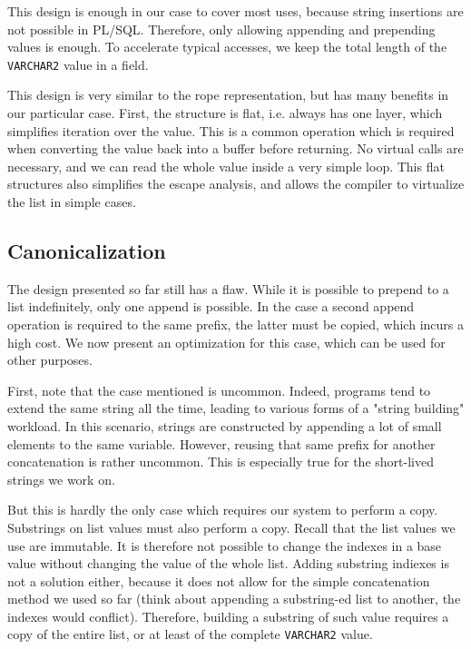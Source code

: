 \documentclass[twoside,11pt,a4paper]{article}
\newcommand{\pls}[1]{\small\texttt{#1}\normalsize}
\newcommand{\plstype}[1]{\pls{#1}}
\newcommand{\varchar}{\plstype{VARCHAR2}}
\begin{document}
This design is enough in our case to cover most uses, because string insertions are not possible in PL/SQL. Therefore, only allowing appending and prepending values is enough. To accelerate typical accesses, we keep the total length of the \varchar{} value in a field.

This design is very similar to the rope representation, but has many benefits in our particular case. First, the structure is flat, i.e. always has one layer, which simplifies iteration over the value. This is a common operation which is required when converting the value back into a buffer before returning. No virtual calls are necessary, and we can read the whole value inside a very simple loop. This flat structures also simplifies the escape analysis, and allows the compiler to virtualize the list in simple cases.

\subsection{Canonicalization}


The design presented so far still has a flaw. While it is possible to prepend to a list indefinitely, only one append is possible. In the case a second append operation is required to the same prefix, the latter must be copied, which incurs a high cost. We now present an optimization for this case, which can be used for other purposes.

First, note that the case mentioned is uncommon. Indeed, programs tend to extend the same string all the time, leading to various forms of a "string building" workload. In this scenario, strings are constructed by appending a lot of small elements to the same variable. However, reusing that same prefix for another concatenation is rather uncommon. This is especially true for the short-lived strings we work on.

But this is hardly the only case which requires our system to perform a copy. Substrings on list values must also perform a copy. Recall that the list values we use are immutable. It is therefore not possible to change the indexes in a base value without changing the value of the whole list. Adding substring indiexes is not a solution either, because it does not allow for the simple concatenation method we used so far (think about appending a substring-ed list to another, the indexes would conflict). Therefore, building a substring of such value requires a copy of the entire list, or at least of the complete \varchar{} value.
\end{document}
